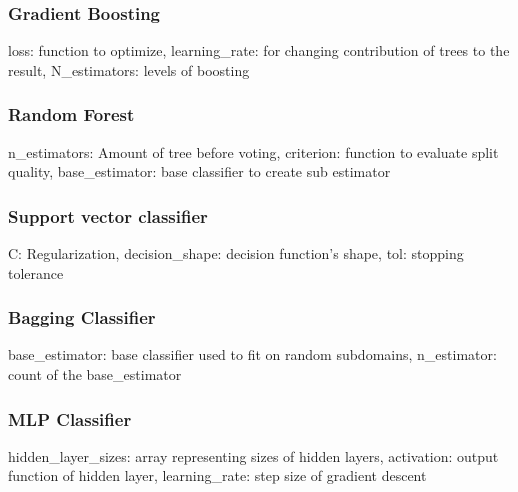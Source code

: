 \documentclass[conference]{IEEEtran}
\begin{document}
\subsubsection{Gradient Boosting}
\label{subsubsection:gradientboosting}
loss: function to optimize, learning\_rate: for changing contribution of trees to the result, N\_estimators: levels of boosting 

\subsubsection{Random Forest}
\label{subsubsection:randomForest}
n\_estimators: Amount of tree before voting, criterion: function to evaluate split quality, base\_estimator: base classifier to create sub estimator

\subsubsection{Support vector classifier}
\label{subsubsection:supportvectorclassifier}
C: Regularization, decision\_shape: decision function’s shape, tol: stopping tolerance

\subsubsection{Bagging Classifier}
\label{subsubsection:baggingClassifier}
base\_estimator: base classifier used to fit on random subdomains, n\_estimator: count of the base\_estimator

\subsubsection{MLP Classifier}
\label{subsubsection:mlpClassifier}
hidden\_layer\_sizes: array representing sizes of hidden layers, activation: output function of hidden layer, learning\_rate: step size of gradient descent 
\end{document}
